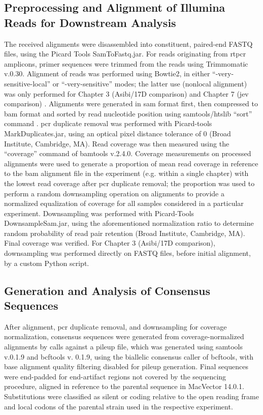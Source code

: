 \subsection{Preprocessing and Alignment of Illumina Reads for Downstream Analysis}
The received alignments were disassembled into constituent, paired-end FASTQ files, using the Picard Tools SamToFastq.jar. For reads originating from \gls{rtpcr} amplicons, primer sequences were trimmed from the reads using Trimmomatic v.0.30.  Alignment of reads was performed using Bowtie2, in either ``-very-sensitive-local'' or ``-very-sensitive'' modes; the latter use (nonlocal alignment) was only performed for Chapter 3 (Asibi/17D comparison) and Chapter 7 (\gls{jev} comparison) \parencite{Langmead:2012jh}. Alignments were generated in \gls{sam} format first, then compressed to \gls{bam} format and sorted by read nucleotide position using samtools/htslib “sort” command \parencite{Li:2009ka}. \Gls{pcr} duplicate removal was performed with Picard-tools MarkDuplicates.jar, using an optical pixel distance tolerance of 0 (Broad Institute, Cambridge, MA). Read coverage was then measured using the “coverage” command of bamtools v.2.4.0. Coverage measurements on processed alignments were used to generate a proportion of mean read coverage in reference to the \gls{bam} alignment file in the experiment (e.g. within a single chapter) with the lowest read coverage after \gls{pcr} duplicate removal; the proportion was used to perform a random downsampling operation on alignments to provide a normalized equalization of coverage for all samples considered in a particular experiment. Downsampling was performed with Picard-Tools DownsampleSam.jar, using the aforementioned normalization ratio to determine random probability of read pair retention (Broad Institute, Cambridge, MA). Final coverage was verified. For Chapter 3 (Asibi/17D comparison), downsampling was performed directly on FASTQ files, before initial alignment, by a custom Python script.

\subsection{Generation and Analysis of Consensus Sequences}
After alignment, \gls{pcr} duplicate removal, and downsampling for coverage  normalization, consensus sequences were generated from coverage-normalized alignments by calls against a pileup file, which was generated using samtools v.0.1.9 and bcftools v. 0.1.9, using the biallelic consensus caller of bcftools, with base alignment quality filtering disabled for pileup generation. Final sequences were end-padded for end-artifact regions not covered by the sequencing procedure, aligned in reference to the parental sequence in MacVector 14.0.1. Substitutions were classified as silent or coding relative to the open reading frame and local codons of the parental strain used in the respective experiment.

